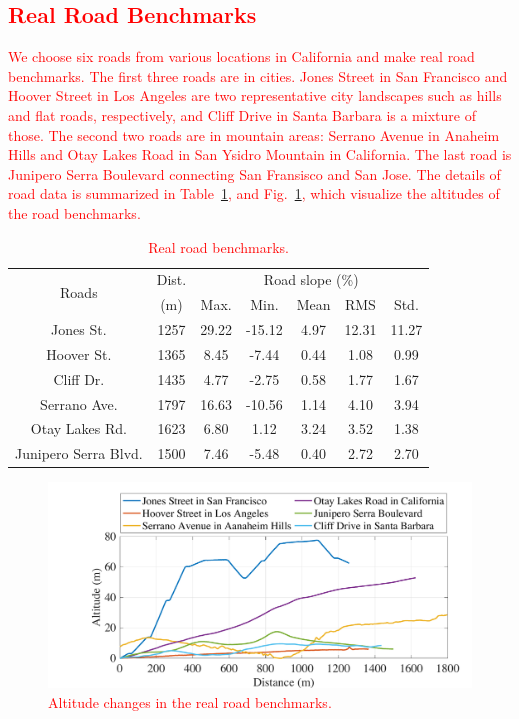 \documentclass{IEEEtran}
\begin{document}
\textcolor{red}{\subsection{Real Road Benchmarks}} \label{subsec:benchmarks}

\textcolor{red}{We choose six  roads from various locations in California and make real road benchmarks. The first three roads are in cities. Jones Street in San Francisco and Hoover Street in Los Angeles are two representative city landscapes such as hills and flat roads, respectively, and Cliff Drive in Santa Barbara is a mixture of those. The second two roads are in mountain areas: Serrano Avenue in Anaheim Hills and Otay Lakes Road in San Ysidro Mountain in California. The last road is Junipero Serra Boulevard connecting San Fransisco and San Jose. The details of road data is summarized in Table~\ref{table:road_bench}, and Fig.~\ref{fig:bench_altitude}, which visualize the altitudes of the road benchmarks.}

\begin{table} 
\caption{\textcolor{red}{Real road benchmarks.}}
\centering
\label{table:road_bench}
\begin{tabular}{|c|c|c|c|c|c|c|}  \hline
\multirow{2}{*}{Roads} 
				&Dist.		&\multicolumn{5}{|c|}{Road slope (\%)}  \\ \cline{3-7}
				&(m)		 	&Max.		&Min. 	&Mean		&RMS 	&Std.	\\ \hline
Jones St. 	&1257		&29.22		&-15.12	&4.97 		&12.31 	&11.27	\\ \hline
Hoover St. 	&1365		&8.45		&-7.44	&0.44		&1.08 	&0.99	\\ \hline
Cliff Dr. 	&1435		&4.77		&-2.75	&0.58		&1.77 	&1.67	\\ \hline
Serrano Ave.		&1797		&16.63		&-10.56	&1.14 		&4.10 	&3.94	\\ \hline
Otay Lakes Rd.		&1623		&6.80		&1.12	&3.24		&3.52 	&1.38	\\ \hline
Junipero Serra Blvd.	&1500		&7.46		&-5.48	&0.40		&2.72 	&2.70	\\ \hline
\end{tabular}
\end{table}


\begin{figure}	 %
\includegraphics[width=1.0\hsize]{Figures/Benchmark_altitude.pdf}
\caption{\textcolor{red}{Altitude changes in the real road benchmarks.}}
\label{fig:bench_altitude}
\end{figure} 
\end{document}
